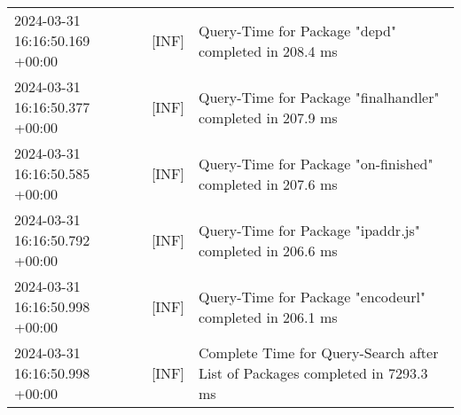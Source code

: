 {{\begin{tabularx}{\textwidth}{|l|l|X|}
                    2024-03-31 16:16:50.169 +00:00 & [INF] & Query-Time for Package "depd" completed in 208.4 ms \\
                    2024-03-31 16:16:50.377 +00:00 & [INF] & Query-Time for Package "finalhandler" completed in 207.9 ms \\
                    2024-03-31 16:16:50.585 +00:00 & [INF] & Query-Time for Package "on-finished" completed in 207.6 ms \\
                    2024-03-31 16:16:50.792 +00:00 & [INF] & Query-Time for Package "ipaddr.js" completed in 206.6 ms \\
                    2024-03-31 16:16:50.998 +00:00 & [INF] & Query-Time for Package "encodeurl" completed in 206.1 ms \\
                    2024-03-31 16:16:50.998 +00:00 & [INF] & Complete Time for Query-Search after List of Packages completed in 7293.3 ms \\
                    \hline
                \end{tabularx}
            }
        }

